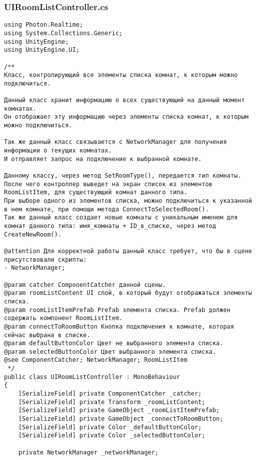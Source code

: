 \subsubsection*{UIRoomListController.cs}
\begin{verbatim}
﻿using Photon.Realtime;
using System.Collections.Generic;
using UnityEngine;
using UnityEngine.UI;

/**
Класс, контролирующий все элементы списка комнат, к которым можно подключиться.

Данный класс хранит информацию о всех существующий на данный момент комнатах.
Он отображает эту информацию через элементы списка комнат, к которым можно подключиться.

Так же данный класс связывается с NetworkManager для получения информации о текущих комнатах.
И отправляет запрос на подключение к выбранной комнате.

Данному классу, через метод SetRoomType(), передается тип комнаты. 
После чего контроллер выведет на экран список из элементов RoomListItem, для существующий комнат данного типа.
При выборе одного из элементов списка, можно подключиться к указанной в нем комнате, при помощи метода ConnectToSelectedRoom().
Так же данный класс создает новые комнаты с уникальным именем для комнат данного типа: имя_комнаты + ID_в_списке, через метод CreateNewRoom().

@attention Для корректной работы данный класс требует, что бы в сцене присутствовали скрипты:
- NetworkManager;

@param catcher ComponentCatcher данной сцены.
@param roomListContent UI слой, в который будут отображаться элементы списка.
@param roomListItemPrefab Prefab элемента списка. Prefab должен содержать компонент RoomListItem.
@param connectToRoomButton Кнопка подключения к комнате, которая сейчас выбрана в списке.
@param defaultButtonColor Цвет не выбранного элемента списка.
@param selectedButtonColor Цвет выбранного элемента списка.
@see ComponentCatcher; NetworkManager; RoomListItem
 */
public class UIRoomListController : MonoBehaviour
{
    [SerializeField] private ComponentCatcher _catcher;
    [SerializeField] private Transform _roomListContent;
    [SerializeField] private GameObject _roomListItemPrefab;
    [SerializeField] private GameObject _connectToRoomButton;
    [SerializeField] private Color _defaultButtonColor;
    [SerializeField] private Color _selectedButtonColor;

    private NetworkManager _networkManager;


\end{verbatim}
